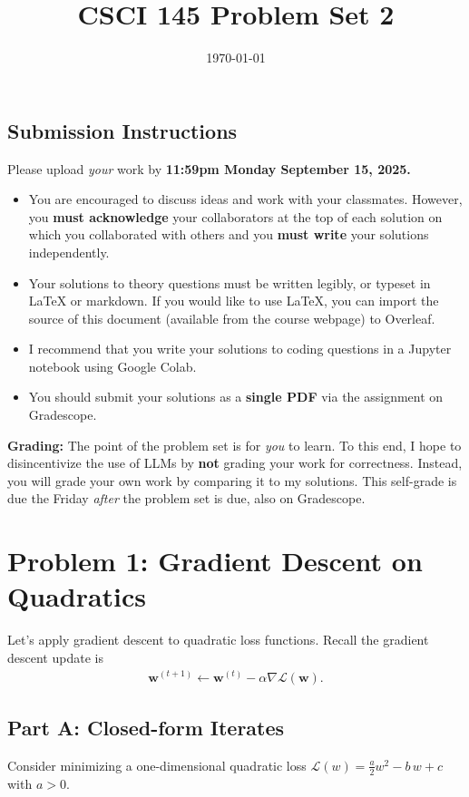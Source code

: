 \documentclass{article}
\title{CSCI 145 Problem Set 2}
\author{} %
\date{\today}
\begin{document}
\maketitle

\subsection*{Submission Instructions}

Please upload \textit{your} work by
\textbf{11:59pm Monday September 15, 2025.}
\begin{itemize}
\item You are encouraged to discuss ideas
and work with your classmates. However, you
\textbf{must acknowledge} your collaborators
at the top of each solution on which
you collaborated with others 
and you \textbf{must write} your solutions
independently.
\item Your solutions to theory questions must
be written legibly, or typeset in LaTeX or markdown.
If you would like to use LaTeX, you can import the source of this document (available from the course webpage) to Overleaf.
\item I recommend that you write your solutions to coding questions in a Jupyter notebook using Google Colab.
\item You should submit your solutions as a \textbf{single PDF} via the assignment on Gradescope.
\end{itemize}

\noindent
\textbf{Grading:} The point of the problem set is for \textit{you} to learn. To this end, I hope to disincentivize the use of LLMs by \textbf{not} grading your work for correctness. Instead, you will grade your own work by comparing it to my solutions. This self-grade is due the Friday \textit{after} the problem set is due, also on Gradescope.

\newpage
\section*{Problem 1: Gradient Descent on Quadratics}

Let's apply gradient descent to quadratic loss functions.
Recall the gradient descent update is
\begin{align}
    \mathbf{w}^{(t+1)} \gets 
    \mathbf{w}^{(t)}
    - \alpha \nabla \mathcal{L}(\mathbf{w}).
\end{align}

\subsection*{Part A: Closed-form Iterates}
Consider minimizing a one-dimensional quadratic loss
$\mathcal{L}(w) = \frac{a}{2} w^2 - b\, w + c$ with $a>0.$
\end{document}
